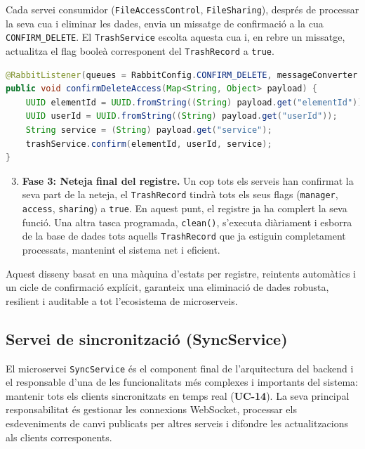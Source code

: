 Cada servei consumidor (\texttt{FileAccessControl}, \texttt{FileSharing}), després de processar la seva cua i eliminar les dades, envia un missatge de confirmació a la cua \texttt{CONFIRM\_DELETE}. El \texttt{TrashService} escolta aquesta cua i, en rebre un missatge, actualitza el flag booleà corresponent del \texttt{TrashRecord} a \texttt{true}.

\begin{lstlisting}[language=Java, caption={Receptor de confirmacions a `TrashService`}]
@RabbitListener(queues = RabbitConfig.CONFIRM_DELETE, messageConverter = "jackson2JsonMessageConverter")
public void confirmDeleteAccess(Map<String, Object> payload) {
    UUID elementId = UUID.fromString((String) payload.get("elementId"));
    UUID userId = UUID.fromString((String) payload.get("userId"));
    String service = (String) payload.get("service");
    trashService.confirm(elementId, userId, service);
}
\end{lstlisting}

\begin{enumerate}
    \setcounter{enumi}{2}
    \item \textbf{Fase 3: Neteja final del registre.} Un cop tots els serveis han confirmat la seva part de la neteja, el \texttt{TrashRecord} tindrà tots els seus flags (\texttt{manager}, \texttt{access}, \texttt{sharing}) a \texttt{true}. En aquest punt, el registre ja ha complert la seva funció. Una altra tasca programada, \texttt{clean()}, s'executa diàriament i esborra de la base de dades tots aquells \texttt{TrashRecord} que ja estiguin completament processats, mantenint el sistema net i eficient.
\end{enumerate}

Aquest disseny basat en una màquina d'estats per registre, reintents automàtics i un cicle de confirmació explícit, garanteix una eliminació de dades robusta, resilient i auditable a tot l'ecosistema de microserveis.

\subsection{Servei de sincronització (SyncService)}

El microservei \texttt{SyncService} és el component final de l'arquitectura del backend i el responsable d'una de les funcionalitats més complexes i importants del sistema: mantenir tots els clients sincronitzats en temps real (\textbf{UC-14}). La seva principal responsabilitat és gestionar les connexions WebSocket, processar els esdeveniments de canvi publicats per altres serveis i difondre les actualitzacions als clients corresponents.

